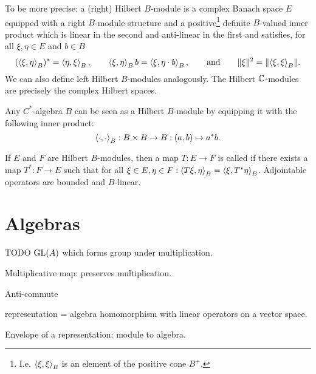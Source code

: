 To be more precise: a (right) Hilbert $B$-module is a complex Banach space $E$ equipped with a right $B$-module structure and a positive\footnote{I.e. $\left\langle \xi, \xi \right\rangle_B$ is an element of the positive cone $B^+$.} definite $B$-valued inner product which is linear in the second and anti-linear in the first and satisfies, for all $\xi,\eta \in E$ and $b\in B$
\[ (\left\langle \xi,\eta \right\rangle_B)^* = \left\langle \eta,\xi \right\rangle_B, \qquad \left\langle \xi, \eta \right\rangle_B b = \left\langle \xi,\eta\cdot b \right\rangle_B, \qquad \text{and} \qquad \lVert\xi\rVert^2 = \lVert\left\langle \xi,\xi \right\rangle_B\rVert. \]
We can also define left Hilbert $B$-modules analogously. The Hilbert $\mathbb{C}$-modules are precisely the complex Hilbert spaces.

Any $C^*$-algebra $B$ can be seen as a Hilbert $B$-module by equipping it with the following inner product:
\[ \left\langle \cdot, \cdot \right\rangle_B: B\times B\to B: (a,b) \mapsto a^*b. \]

If $E$ and $F$ are Hilbert $B$-modules, then a map $T: E \to F$ is called  if there exists a map $T^*: F \to E$ such that for all $\xi\in E, \eta\in F: \left\langle T\xi,\eta \right\rangle_B = \left\langle \xi, T^*\eta \right\rangle_B$. Adjointable operators are bounded and $B$-linear.



\chapter{Algebras}
TODO $\operatorname{GL}(A)$ which forms group under multiplication.

Multiplicative map: preserves multiplication.

Anti-commute

representation = algebra homomorphism with linear operators on a vector space.

Envelope of a representation: module to algebra.

